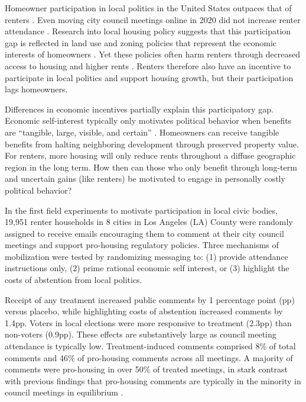 \documentclass[12pt,final,fleqn]{article}
\theoremstyle{plain}
\begin{document}


\setcounter{page}{0}
\pagebreak
\doublespace

Homeowner participation in local politics in the United States outpaces that of renters \citep{yoder2020does, hall2018does, einstein2019participates}. Even moving city council meetings online in 2020 did not increase renter attendance \citep{einstein2021zoom}. Research into local housing policy suggests that this participation gap is reflected in land use and zoning policies that represent the economic interests of homeowners \citep{fischel2005homevoter, einstein2019neighborhood, marble2021self}. Yet these policies often harm renters through decreased access to housing and higher rents \citep{glaeser2005have, glaeser2018economic, charette2015projecting, ganong2017has, lens2016strict, glaeser2002impact, quigley2005effects}. Renters therefore also have an incentive to participate in local politics and support housing growth, but their participation lags homeowners. 

Differences in economic incentives partially explain this participatory gap. Economic self-interest typically only motivates political behavior when benefits are ``tangible, large, visible, and certain'' \citep{citrin1990american}. Homeowners can receive tangible benefits from halting neighboring development through preserved property value. For renters, more housing will only reduce rents throughout a diffuse geographic region in the long term. How then can those who only benefit through long-term and uncertain gains (like renters) be motivated to engage in personally costly political behavior?

In the first field experiments to motivate participation in local civic bodies, 19,951 renter households in 8 cities in Los Angeles (LA) County were randomly assigned to receive emails encouraging them to comment at their city council meetings and support pro-housing regulatory policies.  Three mechanisms of mobilization were tested by randomizing messaging to: (1) provide attendance instructions only, (2) prime rational economic self interest, or (3) highlight the costs of abstention from local politics. 

Receipt of any treatment increased public comments by 1 percentage point (pp) versus placebo, while highlighting costs of abstention increased comments by 1.4pp. Voters in local elections were more responsive to treatment (2.3pp) than non-voters (0.9pp). These effects are substantively large as council meeting attendance is typically low. Treatment-induced comments comprised 8\% of total comments and 46\% of pro-housing comments across all meetings. A majority of comments were pro-housing in over 50\% of treated meetings, in stark contrast with previous findings that pro-housing comments are typically in the minority in council meetings in equilibrium \citep{einstein2021zoom, yoder2020does}.
\end{document}
